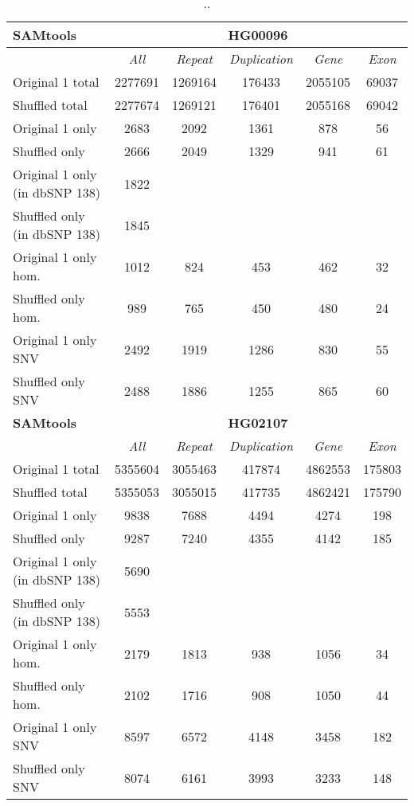 \begin{table}[htb]
\begin{center}
\begin{tabular}{|l|c||c|c|c|c|}
\hline
{\bf SAMtools} & \multicolumn{5}{|c|}{\bf HG00096} \\
\hline
\cline{2-6}
{\bf} & {\it All} & {\it Repeat} & {\it Duplication} & {\it Gene} & {\it Exon} \\
\hline
Original 1 total & 2277691 & 1269164 & 176433 & 2055105 & 69037\\ 
\hline
Shuffled total & 2277674 & 1269121 & 176401 & 2055168 & 69042\\ 
\hline
Original 1 only & 2683 & 2092 & 1361 & 878 & 56\\ 
\hline
Shuffled only & 2666 & 2049 & 1329 & 941 & 61\\ 
\hline
Original 1 only (in dbSNP 138) & 1822 &  &  &  & \\ 
\hline
Shuffled only (in dbSNP 138) & 1845 &  &  &  & \\ 
\hline
Original 1 only hom. & 1012 & 824 & 453 & 462 & 32\\ 
\hline
Shuffled only hom. & 989 & 765 & 450 & 480 & 24\\ 
\hline
Original 1 only SNV & 2492 & 1919 & 1286 & 830 & 55\\ 
\hline
Shuffled only SNV & 2488 & 1886 & 1255 & 865 & 60\\ 
\hline
\hline
{\bf SAMtools} & \multicolumn{5}{|c|}{\bf HG02107} \\
\hline
\cline{2-6}
{\bf} & {\it All} & {\it Repeat} & {\it Duplication} & {\it Gene} & {\it Exon} \\
\hline
Original 1 total & 5355604 & 3055463 & 417874 & 4862553 & 175803\\ 
\hline
Shuffled total & 5355053 & 3055015 & 417735 & 4862421 & 175790\\ 
\hline
Original 1 only & 9838 & 7688 & 4494 & 4274 & 198\\ 
\hline
Shuffled only & 9287 & 7240 & 4355 & 4142 & 185\\ 
\hline
Original 1 only (in dbSNP 138) & 5690 &  &  &  & \\ 
\hline
Shuffled only (in dbSNP 138) & 5553 &  &  &  & \\ 
\hline
Original 1 only hom. & 2179 & 1813 & 938 & 1056 & 34\\ 
\hline
Shuffled only hom. & 2102 & 1716 & 908 & 1050 & 44\\ 
\hline
Original 1 only SNV & 8597 & 6572 & 4148 & 3458 & 182\\ 
\hline
Shuffled only SNV & 8074 & 6161 & 3993 & 3233 & 148\\ 
\hline
\end{tabular}
\end{center}
\caption{ .. }
\label{tab:orig-vs-shuf-samtools}
\end{table}

